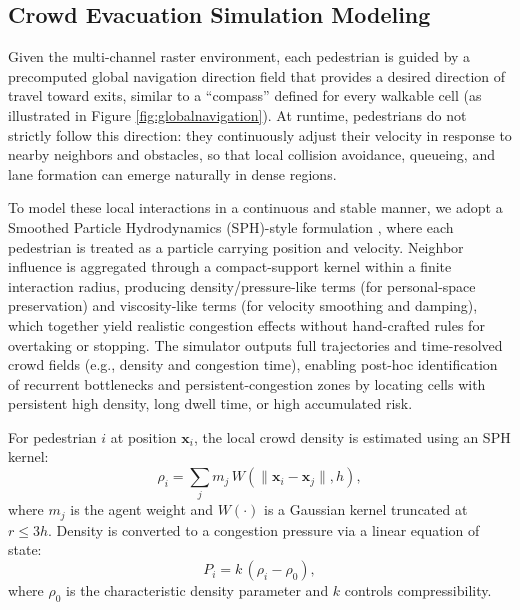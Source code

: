 \documentclass[preprint,12pt]{elsarticle}
\begin{document}
\subsection{Crowd Evacuation Simulation Modeling}
\label{sec:movingmodel}

Given the multi-channel raster environment, each pedestrian is guided by a precomputed global navigation direction field that provides a desired direction of travel toward exits, similar to a ``compass'' defined for every walkable cell (as illustrated in Figure \ref{fig:globalnavigation}).
At runtime, pedestrians do not strictly follow this direction: they continuously adjust their velocity in response to nearby neighbors and obstacles, so that local collision avoidance, queueing, and lane formation can emerge naturally in dense regions.

To model these local interactions in a continuous and stable manner, we adopt a Smoothed Particle Hydrodynamics (SPH)-style formulation \citep{vanToll2021SPHCrowds, Yuan2020SPHPedestrianFlow}, where each pedestrian is treated as a particle carrying position and velocity.
%
Neighbor influence is aggregated through a compact-support kernel within a finite interaction radius, producing density/pressure-like terms (for personal-space preservation) and viscosity-like terms (for velocity smoothing and damping), which together yield realistic congestion effects without hand-crafted rules for overtaking or stopping.
%
The simulator outputs full trajectories and time-resolved crowd fields (e.g., density and congestion time), enabling post-hoc identification of recurrent bottlenecks and persistent-congestion zones by locating cells with persistent high density, long dwell time, or high accumulated risk.


For pedestrian $i$ at position $\mathbf{x}_i$, the local crowd density is estimated using an SPH kernel:
\begin{equation}
\rho_i=\sum_{j} m_j\,W(\|\mathbf{x}_i-\mathbf{x}_j\|,h),
\label{eq:sph-density_s}
\end{equation}
where $m_j$ is the agent weight and $W(\cdot)$ is a Gaussian kernel truncated at $r\le 3h$.
Density is converted to a congestion pressure via a linear equation of state:
\begin{equation}
P_i = k \, (\rho_i - \rho_0),
\label{eq:pressure_s}
\end{equation}
where $\rho_0$ is the characteristic density parameter and $k$ controls compressibility.
\end{document}
